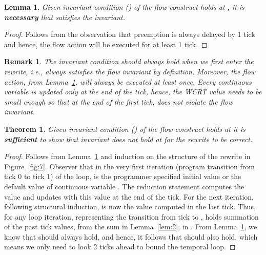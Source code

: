 \documentclass[10pt,journal,cspaper,compsoc]{IEEEtran}
\newtheorem{lem}{Lemma}
\newtheorem*{rem}{Remark}
\newtheorem{thm}{Theorem}
\begin{document}
\begin{lem}
  Given invariant condition () of the flow construct holds at
  , it is \textbf{necessary} that 
  satisfies the invariant.
  \label{lem:3}
\end{lem}

\begin{proof}
  Follows from the observation that preemption is always delayed by 1
  tick and hence, the flow action will be executed for at least 1 tick.
\end{proof}

\begin{rem}
  The invariant condition should always hold when we first enter the
  rewrite, i.e.,  always satisfies the flow invariant by
  definition. Moreover, the flow action, from Lemma~\ref{lem:3}, will
  always be executed at least once. Every continuous variable is updated
  only at the end of the tick, hence, the WCRT value needs to be small
  enough so that at the end of the first tick, 
  does not violate the flow invariant.
\end{rem}

\begin{thm}
  Given invariant condition () of the flow construct holds at
   it is \textbf{sufficient} to show that invariant does not
  hold at  for the rewrite to be correct.
  \label{thm:1}
\end{thm}

\begin{proof}
  Follows from Lemma~\ref{lem:3} and induction on the structure of the
  rewrite in Figure~\ref{fig:7}. Observer that in the very first
  iteration (program transition from tick 0 to tick 1) of the loop,
   is the programmer specified initial value or the default value
  of continuous variable . The reduction statement computes the value
   and updates  with this value at the end of the tick. For the
  next iteration, following structural induction,  is now the
  value  computed in the last tick. Thus, for any loop iteration,
  representing the transition from tick  to ,  holds
  summation of the past  tick values, from the sum in
  Lemma~\ref{lem:2}, in . From Lemma~\ref{lem:3}, we know that
   should always hold, and hence, it follows
  that  should also hold, which means we only
  need to look 2 ticks ahead to bound the temporal loop.


\end{proof}
\end{document}
